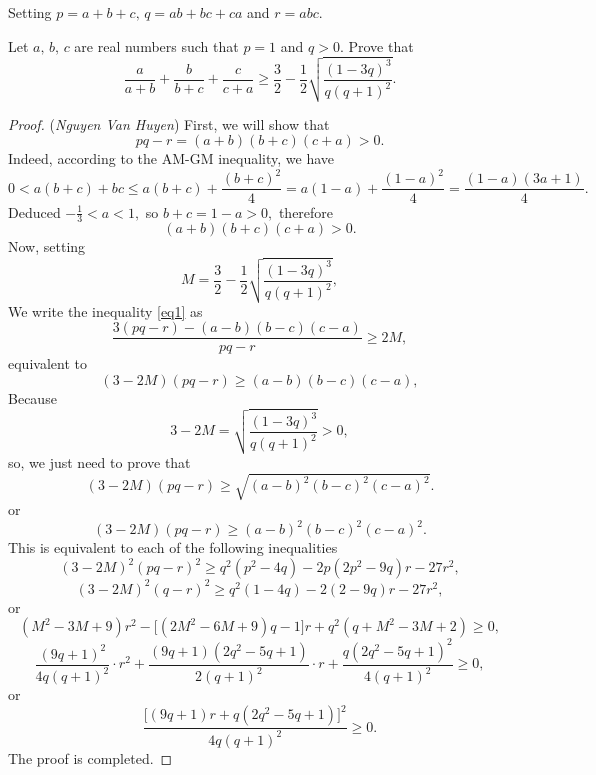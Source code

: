 \documentclass[12pt,a4paper]{book}
\begin{document}
Setting $p=a+b+c,\,q=ab+bc+ca$ and $r=abc.$
\begin{pro}
Let $a,\,b,\,c$ are real numbers such that $p=1$ and $q>0.$ Prove that
\begin{equation}\label{eq1}
\frac{a}{a+b}+\frac{b}{b+c}+\frac{c}{c+a} \ge \frac{3}{2} - \frac{1}{2}\sqrt{\frac{(1-3q)^3}{q(q+1)^2}}.
\end{equation}
\end{pro}

\begin{proof} (\textit{Nguyen Van Huyen}) First, we will show that
\[pq-r = (a+b)(b+c)(c+a)>0.\]
Indeed, according to the AM-GM inequality, we have
\[0 < a(b+c)+bc \leqslant a(b+c)+\frac{(b+c)^2}{4}=a(1-a)+\frac{(1-a)^2}{4} = \frac{(1-a)(3a+1)}{4}.\]
Deduced $- \frac{1}{3} < a < 1,$ so $b+c=1-a>0,$ therefore
\[(a+b)(b+c)(c+a)>0.\]
Now, setting
\[M = \frac{3}{2} - \frac{1}{2}\sqrt{\frac{(1-3q)^3}{q(q+1)^2}},\]
We write the inequality \eqref{eq1} as
\[\frac{3(pq-r)-(a-b)(b-c)(c-a)}{pq-r} \geq 2M,\]
equivalent to
\[(3 - 2M)(pq-r) \ge (a-b)(b-c)(c-a),\]
Because
\[3 - 2M = \sqrt{\frac{(1-3q)^3}{q(q+1)^2}}>0,\]
so, we just need to prove that 
\[(3 - 2M)(pq-r) \ge \sqrt{(a-b)^2(b-c)^2(c-a)^2}.\]
or
\[(3 - 2M)(pq-r) \ge (a-b)^2(b-c)^2(c-a)^2.\]
This is equivalent to each of the following inequalities
\[(3 - 2M)^2(pq-r)^2 \ge q^2(p^2-4q)-2p(2p^2-9q)r-27r^2,\]
\[(3 - 2M)^2(q-r)^2 \ge q^2(1-4q)-2(2-9q)r-27r^2,\]
or
\[(M^2-3M+9)r^2-\big[(2M^2-6M+9)q-1\big]r+q^2(q+M^2-3M+2) \ge 0,\]
\[\frac{(9q+1)^2}{4q(q+1)^2} \cdot r^2 + \frac{(9q+1)(2q^2-5q+1)}{2(q+1)^2}\cdot r+\frac{q(2q^2-5q+1)^2}{4(q+1)^2} \ge 0,\]
or
\[\frac{\big[(9q+1)r+q(2q^2-5q+1)\big]^2}{4q(q+1)^2} \ge 0.\]
The proof is completed.
\end{proof}
\end{document}
